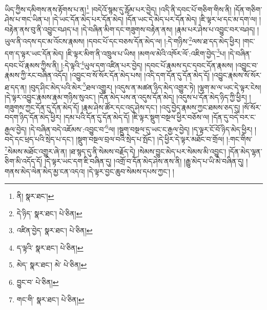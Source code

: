 ཡིད་ཀྱིས་དམིགས་ནས་རྟོགས་པ་ན།\footnote{ནི།  སྣར་ཐང་། } །བདེའོ་སྙམ་དུ་རློམ་པར་བྱེད། །འདི་ནི་དབང་པོ་གཅིག་གིས་ནི། །དོན་གཅིག་ཤེས་པ་གང་ཡིན་པ། །དེ་ཡང་དོན་མེད་པར་དོན་མེད། །དོན་ཡང་དེ་མེད་པར་དོན་མེད། །ཇི་ལྟར་ཕ་དང་མ་དག་ལ། །བརྟེན་ནས་བུ་ནི་འབྱུང་བཤད་པ། །དེ་བཞིན་མིག་དང་གཟུགས་བརྟེན་ནས། །རྣམ་པར་ཤེས་པ་འབྱུང་བར་བཤད། །ཡུལ་ནི་འདས་དང་མ་འོངས་རྣམས། །དབང་པོ་དང་བཅས་དོན་མེད་ལ། །:དེ་གཉིས་\footnote{དེ་ཉིད་  སྣར་ཐང་།  པེ་ཅིན། }ལས་ཐ་དད་མེད་ཕྱིར། །གང་དག་ད་ལྟར་ཡང་དོན་མེད། །ཇི་ལྟར་མིག་ནི་འཁྲུལ་པ་ཡིས། །མགལ་མེའི་འཁོར་ལོ་:འཇིག་བྱེད་\footnote{འཛིན་བྱེད་  སྣར་ཐང་།  པེ་ཅིན། }པ། །དེ་བཞིན་དབང་པོ་རྣམས་ཀྱིས་ནི། །:དེ་ལྟའི་\footnote{ད་ལྟའི་  སྣར་ཐང་།  པེ་ཅིན། }ཡུལ་དག་འཛིན་པར་བྱེད། །དབང་པོ་རྣམས་དང་དབང་དོན་རྣམས། །འབྱུང་བ་རྣམས་ཀྱི་རང་བཞིན་འདོད། །འབྱུང་བ་སོ་སོར་དོན་མེད་པས། །འདི་དག་དོན་དུ་དོན་མེད་དོ། །འབྱུང་རྣམས་སོ་སོར་ཐ་དད་ན། །བུད་ཤིང་མེད་པའི་མེར་\footnote{མེད་  སྣར་ཐང་། མེ་  པེ་ཅིན། }ཐལ་འགྱུར། །འདུས་ན་མཚན་ཉིད་མེད་འགྱུར་ཏེ། །ལྷག་མ་ལ་ཡང་དེ་ལྟར་ངེས། །དེ་ལྟར་འབྱུང་རྣམས་རྣམ་གཉིས་སུའང་། །དོན་མེད་པས་ན་འདུས་དོན་མེད། །འདུས་པ་དོན་མེད་ཉིད་ཀྱི་ཕྱིར། །གཟུགས་ཀྱང་དོན་དུ་དོན་མེད་དོ། །རྣམ་ཤེས་ཚོར་དང་འདུ་ཤེས་དང་། །འདུ་བྱེད་རྣམས་ཀྱང་ཐམས་ཅད་དུ། །སོ་སོར་བདག་ཉིད་དོན་མེད་ཕྱིར། །དམ་པའི་དོན་དུ་དོན་མེད་དོ། །ཇི་ལྟར་སྡུག་བསྔལ་ཕྱིར་བཅོས་ལ། །དོན་དུ་བདེ་བར་ང་རྒྱལ་བྱེད། །དེ་བཞིན་བདེ་འཇོམས་:འབྱུང་བ་\footnote{བྱུང་བ་  པེ་ཅིན། }ལ། །སྡུག་བསྔལ་དུ་ཡང་ང་རྒྱལ་བྱེད། །ད་ལྟར་ངོ་བོ་ཉིད་མེད་ཕྱིར། །བདེ་དང་ཕྲད་པའི་སྲེད་པ་དང་། །སྡུག་བསྔལ་བྲལ་བའི་སྲེད་པ་སྤོང་། །དེ་ཕྱིར་དེ་ལྟར་མཐོང་བ་གྲོལ། །:གང་གིས་\footnote{གང་གི་  སྣར་ཐང་།  པེ་ཅིན། }སེམས་མཐོང་འགྱུར་ཞེ་ན། །ཐ་སྙད་དུ་ནི་སེམས་བརྗོད་དེ། །སེམས་བྱུང་མེད་པར་སེམས་མི་འབྱུང་། །དོན་མེད་ལྷན་ཅིག་མི་འདོད་དོ། །དེ་ལྟར་ཡང་དག་ཇི་བཞིན་དུ། །འགྲོ་བ་དོན་མེད་ཤེས་ནས་ནི། །རྒྱུ་མེད་པ་ཡི་མེ་བཞིན་དུ། །གནས་མེད་ལེན་མེད་མྱ་ངན་འདའ། །དེ་ལྟར་བྱང་ཆུབ་སེམས་དཔས་ཀྱང་། །
